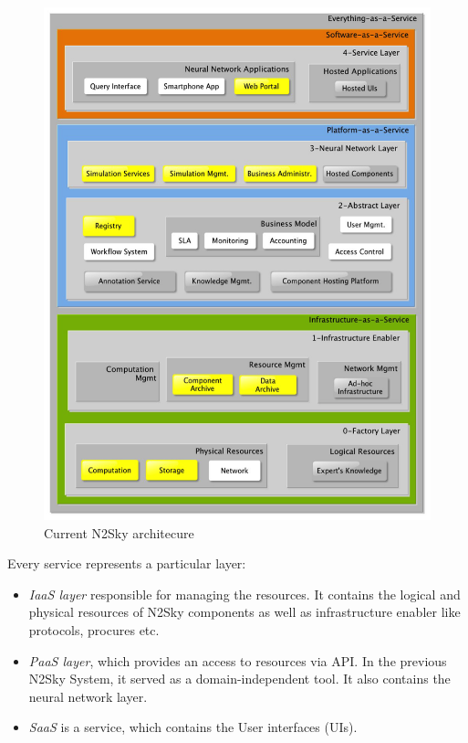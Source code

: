 \begin{figure}[htbp]
\begin{center}
  \includegraphics[width=\linewidth]{components/2/current_arch.png}
  \caption{Current N2Sky architecure}
  \label{fig:current_arch}
\end{center}
\end{figure}

Every service represents a particular layer:
\begin{itemize}
\item \emph{IaaS layer}  responsible for managing the resources. It contains the logical and physical resources of N2Sky components as well as infrastructure enabler like protocols, procures etc. 
\item \emph{PaaS layer}, which provides an access to resources via API. In the previous N2Sky System, it served as a domain-independent tool. It also contains the neural network layer.
\item \emph{SaaS} is a service, which contains the User interfaces (UIs).
\end{itemize}

